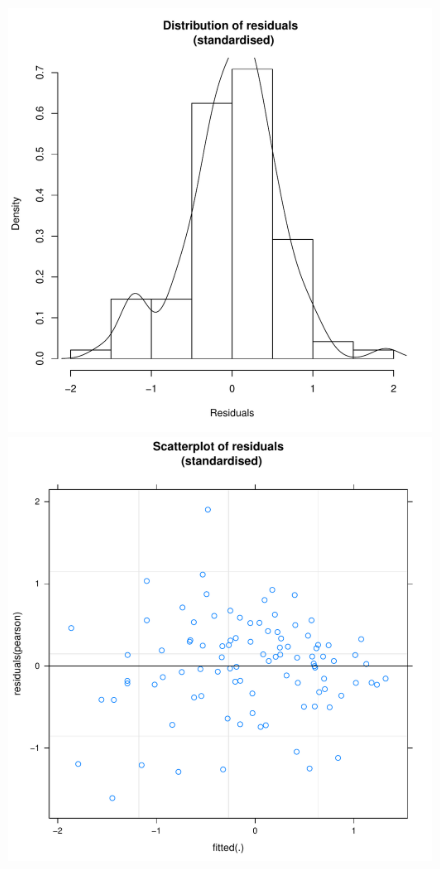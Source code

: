 \begin{CJK}{UTF8}{gbsn}
 \begin{figure}[!htbp]
     \includegraphics[scale =.4]{images/MLM1aHist.pdf}
     \includegraphics[scale =.4]{images/MLM1aScatter.pdf}

\end{figure}
\end{CJK}
